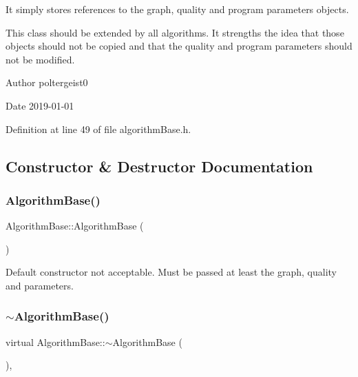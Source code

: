 It simply stores references to the graph, quality and program parameters objects.

This class should be extended by all algorithms. It strengths the idea that those objects should not be copied and that the quality and program parameters should not be modified.

\begin{DoxyAuthor}{Author}
poltergeist0
\end{DoxyAuthor}
\begin{DoxyDate}{Date}
2019-\/01-\/01 
\end{DoxyDate}


Definition at line 49 of file algorithm\+Base.\+h.



\subsection{Constructor \& Destructor Documentation}
\mbox{\label{classAlgorithmBase_ac498e7949995484bd5a9a3188c599edf}} 
\subsubsection{\texorpdfstring{Algorithm\+Base()}{AlgorithmBase()}\hspace{0.1cm}{\footnotesize\ttfamily [1/2]}}
{\footnotesize\ttfamily Algorithm\+Base\+::\+Algorithm\+Base (\begin{DoxyParamCaption}{ }\end{DoxyParamCaption})\hspace{0.3cm}{\ttfamily [delete]}}

Default constructor not acceptable. Must be passed at least the graph, quality and parameters. \mbox{\label{classAlgorithmBase_a01862a2fa8e29b154e6d95c1287a598e}} 
\subsubsection{\texorpdfstring{$\sim$\+Algorithm\+Base()}{~AlgorithmBase()}}
{\footnotesize\ttfamily virtual Algorithm\+Base\+::$\sim$\+Algorithm\+Base (\begin{DoxyParamCaption}{ }\end{DoxyParamCaption})\hspace{0.3cm}{\ttfamily [inline]}, {\ttfamily [virtual]}}

